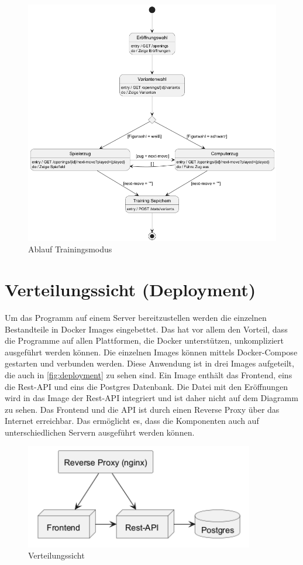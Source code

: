 \begin{figure}[h]
    \includegraphics[width=\linewidth]{images/diagrams/sd_training}
    \caption{Ablauf Trainingsmodus}
    \label{fig:sd_training}
\end{figure}

\clearpage

\section{Verteilungssicht (Deployment)}
Um das Programm auf einem Server bereitzustellen werden die einzelnen Bestandteile in Docker Images eingebettet. Das hat vor allem den Vorteil, dass die Programme auf allen Plattformen, die Docker unterstützen, unkompliziert ausgeführt werden können. Die einzelnen Images können mittels Docker-Compose gestarten und verbunden werden. Diese Anwendung ist in drei Images aufgeteilt, die auch in \autoref{fig:deployment} zu sehen sind. Ein Image enthält das Frontend, eins die Rest-API und eins die Postgres Datenbank. Die Datei mit den Eröffnungen wird in das Image der Rest-API integriert und ist daher nicht auf dem Diagramm zu sehen. Das Frontend und die API ist durch einen Reverse Proxy über das Internet erreichbar. Das ermöglicht es, dass die Komponenten auch auf unterschiedlichen Servern ausgeführt werden können.
 
\begin{figure}[h]
    \centering
    \includegraphics[width=10cm]{images/diagrams/deployment}
    \caption{Verteilungssicht}
    \label{fig:deployment}
\end{figure}

